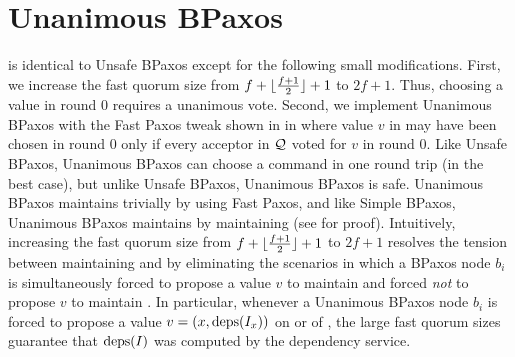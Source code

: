 \section{Unanimous BPaxos}
 is identical to Unsafe BPaxos except for the
following small modifications.  First, we increase the fast quorum size from
$f + \lfloor\frac{f + 1}{2}\rfloor + 1$ to $2f + 1$. Thus, choosing a value in round $0$ requires a
unanimous vote. Second, we implement Unanimous BPaxos with the Fast Paxos
tweak shown in  in  where value
$v$ in  may have been chosen in round $0$ only if
every acceptor in $\mathcal{Q}$ voted for $v$ in round $0$. Like Unsafe BPaxos,
Unanimous BPaxos can choose a command in one round trip (in the best case), but
unlike Unsafe BPaxos, Unanimous BPaxos is safe.
%
Unanimous BPaxos maintains  trivially by using Fast
Paxos, and like Simple BPaxos, Unanimous BPaxos maintains
 by maintaining  (see
 for proof).
%
Intuitively, increasing the fast quorum size from $f + \lfloor\frac{f + 1}{2}\rfloor + 1$ to $2f +
1$ resolves the tension between maintaining  and
 by eliminating the scenarios in which a BPaxos node
$b_i$ is simultaneously forced to propose a value $v$ to maintain
 and forced \emph{not} to propose $v$ to maintain
. In particular, whenever a Unanimous BPaxos node
$b_i$ is forced to propose a value $v = (x, \text{deps}(I_x))$ on
 or  of
, the large fast quorum sizes guarantee that $\text{deps}(I)$
was computed by the dependency service.
